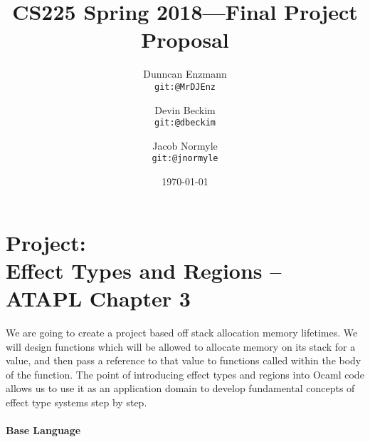 \documentclass{article}
\title{CS225 Spring 2018---Final Project Proposal}
\author{
  Dunncan Enzmann \\ \small{\texttt{git:@MrDJEnz}}
  \and Devin Beckim \\ \small{\texttt{git:@dbeckim}}
  \and Jacob Normyle \\ \small{\texttt{git:@jnormyle}}
}
\date{\today}
\begin{document}
\maketitle

\section*{Project: \\Effect Types and Regions --  ATAPL Chapter 3}

We are going to create a project based off stack allocation memory lifetimes. We will design functions which will be allowed to allocate memory on its stack for a value, and then pass a reference to that value to functions called within the body of the function. The point of introducing effect types and regions into Ocaml code allows us to use it as an application domain to develop fundamental concepts of effect type systems step by step.

\paragraph{Base Language}
\end{document}
